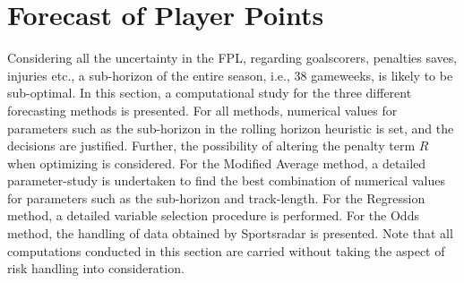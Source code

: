 \section{Forecast of Player Points}
\label{Exp_setup_Player_Performance_Prediction}


Considering all the uncertainty in the FPL, regarding goalscorers, penalties saves, injuries etc., a sub-horizon of the entire season, i.e., 38 gameweeks, is likely to be sub-optimal. In this section, a computational study for the three different forecasting methods is presented. For all methods, numerical values for parameters such as the sub-horizon in the rolling horizon heuristic is set, and the decisions are justified. Further, the possibility of altering the penalty term $R$ when optimizing is considered. For the Modified Average method, a detailed parameter-study is undertaken to find the best combination of numerical values for parameters such as the sub-horizon and track-length. For the Regression method, a detailed variable selection procedure is performed. For the Odds method, the handling of data obtained by Sportsradar is presented. Note that all computations conducted in this section are carried without taking the aspect of risk handling into consideration.

